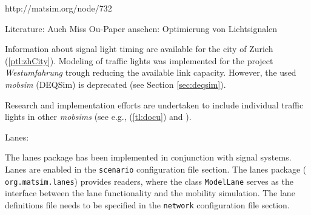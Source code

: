 http://matsim.org/node/732

Literature: \citet[][]{GretherEtAl_ABMTRANS_2012, Grether_PhDThesis_2014, Neumann_MastersThesis_2008}
Auch Miss Ou-Paper ansehen: Optimierung von Lichtsignalen

\citet[][p.?]{BalmerEtAl_ResRep_bdktzrh_2009}


Information about signal light timing are available for the city of Zurich  \citep{STAPOZH-DAV_unpub_gtZH_2008} (\ref{ptl:zhCity}). Modeling of traffic lights was implemented for the project \emph{Westumfahrung} trough reducing the available link capacity. However, the used \emph{mobsim} (DEQSim) is deprecated (see Section \ref{sec:deqsim}).

Research and implementation efforts are undertaken to include individual traffic lights in other \emph{mobsims} (see e.g., (\ref{tl:docu}) and \citet[][]{Neumann_MastersThesis_2008}).


Lanes:

The lanes package has been implemented in conjunction with signal systems. Lanes are enabled in the \lstinline|scenario| configuration file section. The lanes package (\lstinline| org.matsim.lanes|) provides readers, where the class \lstinline|ModelLane| serves as the interface between the lane functionality and the mobility simulation. The lane definitions file needs to be specified in the \lstinline|network| configuration file section.

